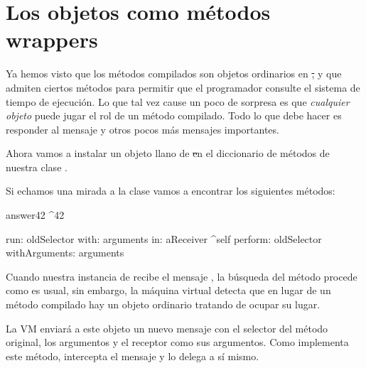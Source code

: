 \documentclass[a4paper,10pt,twoside]{book}
\begin{document}
\section{Los objetos como m\'etodos wrappers}

Ya hemos visto que los m\'etodos compilados son objetos ordinarios en
\st, y que admiten ciertos m\'etodos para permitir que el programador
consulte el sistema de tiempo de ejecuci\'on.  Lo que tal vez cause un
poco de sorpresa es que \emph{cualquier objeto}  puede jugar el rol de
un m\'etodo compilado.  Todo lo que debe hacer es responder al mensaje
 y otros pocos m\'as mensajes importantes.



Ahora vamos a instalar un objeto llano de \st en el diccionario de
m\'etodos de nuestra clase .



Si echamos una mirada a la clase 
vamos a encontrar los siguientes m\'etodos:

\begin{code}{}
answer42
        ^42

run: oldSelector with: arguments in: aReceiver
        ^self perform: oldSelector withArguments: arguments
\end{code}

Cuando nuestra instancia de  recibe el mensaje ,
la b\'usqueda del m\'etodo procede como es usual, sin embargo, la m\'aquina
virtual detecta que en lugar de un m\'etodo compilado hay un objeto
ordinario tratando de ocupar su lugar.

La VM enviar\'a a este objeto un nuevo mensaje  con el
selector del m\'etodo original, los argumentos y el receptor como sus
argumentos.
Como   implementa este m\'etodo, intercepta
el mensaje y lo delega a s\'i mismo.
\end{document}
